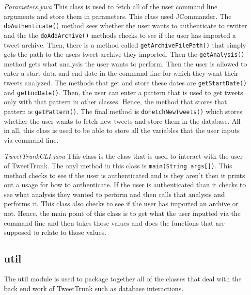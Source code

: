 \documentclass[a4paper, 12pt]{article}
\begin{document}
\begin{adjustwidth}{2em}{0pt}
\begin{adjustwidth}{2em}{0pt}
\noindent \textit{Parameters.java}  \newline
This class is used to fetch all of the user command line arguments and store them in parameters. This class used JCommander. The \texttt{doAuthenticate()} method sees whether the user wants to authenticate to twitter and the the \texttt{doAddArchive()} methods checks to see if the user has imported a tweet archive. Then, there is a method called \texttt{getArchiveFilePath()} that simply gets the path to the users tweet archive they imported. Then the \texttt{getAnalysis()} method gets what analysis the user wants to perform. Then the user is allowed to enter a start data and end date in the command line for which they want their tweets analyzed. The methods that get and store these dates are \texttt{getStartDate()} and \texttt{getEndDate()}. Then, the user can enter a pattern that is used to get tweets only with that pattern in other classes. Hence, the method that stores that pattern is \texttt{getPattern()}. The final method is \texttt{doFetchNewTweets()} which stores whether the user wants to fetch new tweets and store them in the database. All in all, this class is used to be able to store all the variables that the user inputs via command line. \newline\newline
	
\noindent \textit{TweetTrunkCLI.java} \newline
This class is the class that is used to interact with the user of TweetTrunk. The onyl method in this class is \texttt{main(String args[])}. This method checks to see if the user is authenticated and is they aren't then it prints out a usage for how to authenticate. If the user is authenticated than it checks to see what analysis they wanted to perform and then calls that analysis and performs it. This class also checks to see if the user has imported an archive or not. Hence, the main point of this class is to get what the user inputted via the command line and then takes those values and does the functions that are supposed to relate to those values.\newline\newline


\end{adjustwidth}
\subsection{util} \label{sec:archc}
\begin{adjustwidth}{2em}{0pt}
The util module is used to package together all of the classes that deal with the back end work of TweetTrunk such as database interactions.\newline
 

\end{adjustwidth}
\end{adjustwidth}
\end{document}
